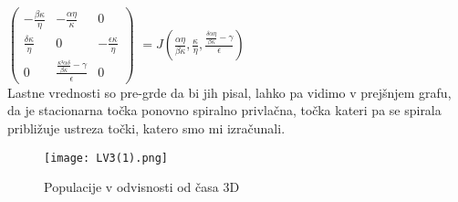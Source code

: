 \documentclass[11pt]{report}
\begin{document}
 	\hspace{25mm}
 	$\begin{pmatrix}
 		-\frac{\beta \kappa}{\eta} & -\frac{\alpha \eta}{\kappa}& 0 \\
 		\frac{\delta \kappa}{\eta}& 0 & - \frac{\epsilon \kappa}{\eta} \\
 		0 & \frac{\frac{\kappa ² \alpha \delta }{\beta \kappa} - \gamma}{\epsilon} & 0
 	\end{pmatrix}$
 	$=J(\frac{\alpha \eta}{\beta \kappa},\frac{\kappa}{\eta}, \frac{\frac{\delta \alpha \eta}{\beta \kappa} - \gamma}{\epsilon})$ \\
 
 	Lastne vrednosti so pre-grde da bi jih pisal, lahko pa vidimo v prejšnjem grafu, da je stacionarna točka ponovno spiralno privlačna, točka kateri pa se spirala približuje ustreza točki, katero smo mi izračunali.
	\begin{figure}
		\centering
		\hspace{-35mm}
		\begin{minipage}{0.7\textwidth}
			\centering
			\vspace{-5mm}
			\texttt{[image: LV3(1).png]}
			\hspace{-20mm}
			\vspace{-5mm}
			\caption{Populacije v odvisnosti od časa 3D}
		\end{minipage}
	\end{figure}
	\newpage
\end{document}
